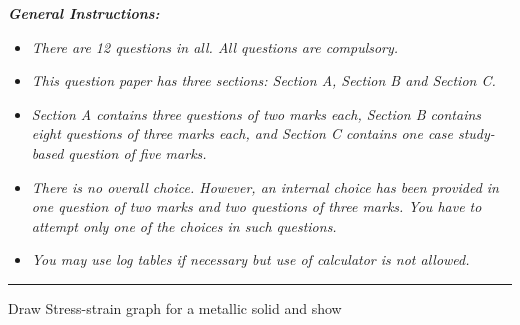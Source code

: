 \documentclass[10pt, a4paper]{exam}
\begin{document}
	\begin{multicols*}{2}
    
    \noindent \textbf{\textit{General Instructions:}}
    \begin{itemize}
      \setlength{\itemsep}{1pt}
      \setlength{\parskip}{0pt}
      \setlength{\parsep}{0pt}
      \item \textit{There are 12 questions in all. All questions are compulsory.}
      \item \textit{This question paper has three sections: Section A, Section B and Section C.}
      \item \textit{Section A contains three questions of two marks each, Section B contains eight questions of three marks each, and Section C contains one case study-based question of five marks.}
      \item \textit{There is no overall choice. However, an internal choice has been provided in one question of two marks and two questions of three marks. You have to attempt only one of the choices in such questions.}
      \item \textit{You may use log tables if necessary but use of calculator is not allowed.}
    \end{itemize}
    \hrule{\hfill}
    \noindent 
    
    \begin{questions}
    
        \question Draw Stress-strain graph for a metallic solid and show
    
        

\end{questions}
\end{multicols*}
\end{document}
